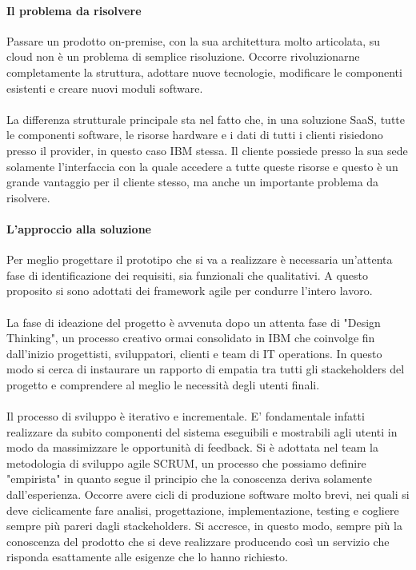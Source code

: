 \paragraph{Il problema da risolvere}
Passare un prodotto on-premise, con la sua architettura molto articolata, su cloud non è un problema di semplice risoluzione. Occorre rivoluzionarne completamente la struttura, adottare nuove tecnologie, modificare le componenti esistenti e creare nuovi moduli software. 

\paragraph{}
La differenza strutturale principale sta nel fatto che, in una soluzione SaaS, tutte le componenti software, le risorse hardware e i dati di tutti i clienti risiedono presso il provider, in questo caso IBM stessa. Il cliente possiede presso la sua sede solamente l'interfaccia con la quale accedere a tutte queste risorse e questo è un grande vantaggio per il cliente stesso, ma anche un importante problema da risolvere. 

\paragraph{L'approccio alla soluzione}
Per meglio progettare il prototipo che si va a realizzare è necessaria un'attenta fase di identificazione dei requisiti, sia funzionali che qualitativi. A questo proposito si sono adottati dei framework agile per condurre l'intero lavoro. 
\paragraph{}
La fase di ideazione del progetto è avvenuta dopo un attenta fase di "Design Thinking", un processo creativo ormai consolidato in IBM che coinvolge fin dall'inizio progettisti, sviluppatori, clienti e team di IT operations. In questo modo si cerca di instaurare un rapporto di empatia tra tutti gli stackeholders del progetto e comprendere al meglio le necessità degli utenti finali.
\paragraph{}
Il processo di sviluppo è iterativo e incrementale. E' fondamentale infatti realizzare da subito componenti del sistema eseguibili e mostrabili agli utenti in modo da massimizzare le opportunità di feedback. Si è adottata nel team la metodologia di sviluppo agile SCRUM, un processo che possiamo definire "empirista" in quanto segue il principio che la conoscenza deriva solamente dall'esperienza. Occorre avere cicli di produzione software molto brevi, nei quali si deve ciclicamente fare analisi, progettazione, implementazione, testing e cogliere sempre più pareri dagli stackeholders. Si accresce, in questo modo, sempre più la conoscenza del prodotto che si deve realizzare producendo così un servizio che risponda esattamente alle esigenze che lo hanno richiesto.

